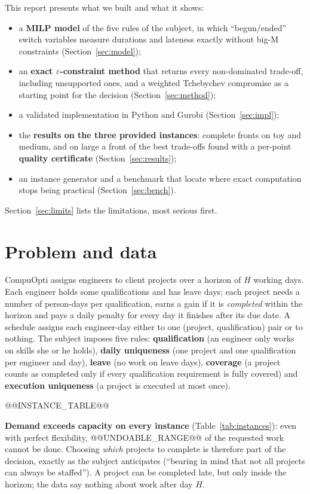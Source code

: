 \documentclass[11pt,a4paper]{article}
\theoremstyle{plain}
\newcommand{\eps}{\varepsilon}
\begin{document}
This report presents what we built and what it shows:
\begin{itemize}
  \item a \textbf{MILP model} of the five rules of the subject, in which ``begun/ended'' switch variables measure durations and lateness exactly without big-M constraints (Section~\ref{sec:model});
  \item an \textbf{exact $\eps$-constraint method} that returns every non-dominated trade-off, including unsupported ones, and a weighted Tchebychev compromise as a starting point for the decision (Section~\ref{sec:method});
  \item a validated implementation in Python and Gurobi (Section~\ref{sec:impl});
  \item the \textbf{results on the three provided instances}: complete fronts on toy and medium, and on large a front of the best trade-offs found with a per-point \textbf{quality certificate} (Section~\ref{sec:results});
  \item an instance generator and a benchmark that locate where exact computation stops being practical (Section~\ref{sec:bench}).
\end{itemize}
Section~\ref{sec:limits} lists the limitations, most serious first.

\section{Problem and data}\label{sec:problem}

CompuOpti assigns engineers to client projects over a horizon of $H$ working days. Each engineer holds some qualifications and has leave days; each project needs a number of person-days per qualification, earns a gain if it is \emph{completed} within the horizon and pays a daily penalty for every day it finishes after its due date.
A schedule assigns each engineer-day either to one (project, qualification) pair or to nothing. The subject imposes five rules:
\textbf{qualification} (an engineer only works on skills she or he holds),
\textbf{daily uniqueness} (one project and one qualification per engineer and day),
\textbf{leave} (no work on leave days),
\textbf{coverage} (a project counts as completed only if every qualification requirement is fully covered) and
\textbf{execution uniqueness} (a project is executed at most once).

@@INSTANCE_TABLE@@

\textbf{Demand exceeds capacity on every instance} (Table~\ref{tab:instances}): even with perfect flexibility, @@UNDOABLE_RANGE@@ of the requested work cannot be done. Choosing \emph{which} projects to complete is therefore part of the decision, exactly as the subject anticipates (``bearing in mind that not all projects can always be staffed''). A project can be completed late, but only inside the horizon; the data say nothing about work after day $H$.
\end{document}
